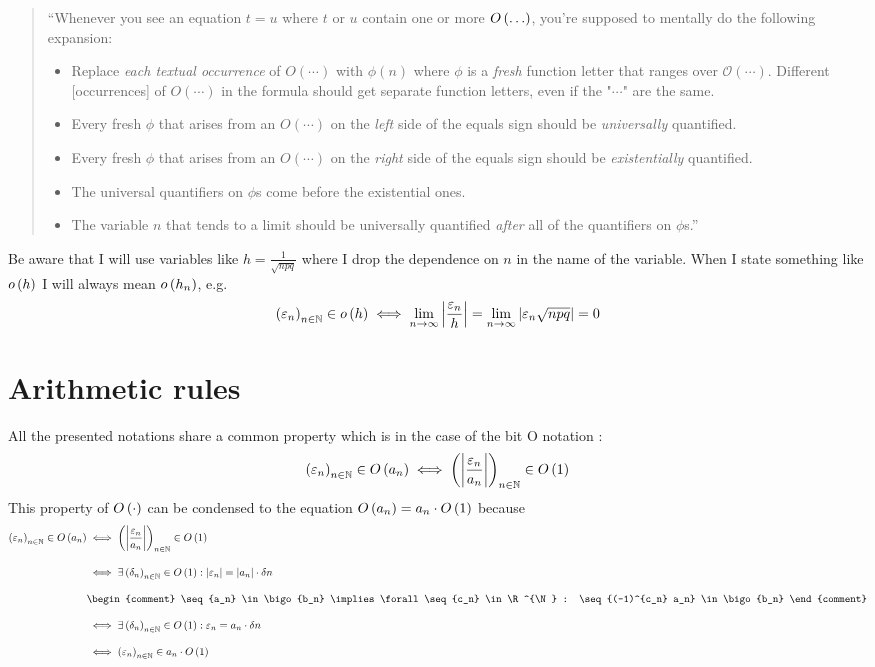 \begin{quote}
  ``Whenever you see an equation $t=u$ where $t$ or $u$ contain one or more $O\left( {\ldots} \right)$, you're supposed to mentally do the following expansion:
  \begin{itemize}
    \item Replace \emph{each textual occurrence} of $O(\cdots)$ with $\phi(n)$ where $\phi$ is a \emph{fresh} function letter that ranges over $\mathcal O(\cdots)$. Different [occurrences] of $O(\cdots)$ in the formula should get separate function letters, even if the "$\cdots$" are the same.
    \item Every fresh $\phi$ that arises from an $O(\cdots)$ on the \emph{left} side of the equals sign should be \emph{universally} quantified.
    \item Every fresh $\phi$ that arises from an $O(\cdots)$ on the \emph{right} side of the equals sign should be \emph{existentially} quantified.
    \item The universal quantifiers on $\phi$s come before the existential ones.
    \item The variable $n$ that tends to a limit should be universally quantified \emph{after} all of the quantifiers on $\phi$s.''
  \end{itemize}
\end{quote}

\begin{remark}
  Be aware that I will use variables like $h=\frac{1}{\sqrt{npq}}$ where I drop the dependence on $n$ in the name of the variable. When I state something like $o\left( {h} \right)$ I will always mean $o\left( {h_n} \right)$, e.g.
  \begin{align}
    \left({\varepsilon_n}\right)_{{n}\in\mathbb N} \in o\left( {h} \right) \iff \lim_{n\to\infty} \left|{\frac{\varepsilon_n}{h}}\right| = \lim_{n\to\infty} \left|{\varepsilon_n \sqrt{npq}}\right| = 0
  \end{align}
\end{remark}

\section{Arithmetic rules}

All the presented notations share a common property which is in the case of the bit O notation \cite{tampis:general}:
\begin{align}
  \left({\varepsilon_n}\right)_{{n}\in\mathbb N} \in O\left( {a_n} \right) \iff \left({\left|{\frac{\varepsilon_n}{a_n}}\right|}\right)_{{n}\in\mathbb N} \in O\left( {1} \right)
\end{align}
This property of $O\left( {\cdot} \right)$ can be condensed to the equation $O\left( {a_n} \right) = a_n \cdot O\left( {1} \right)$ because
\begin{align}
  \seq{\epsilon_n} \in \bigo{a_n} & \iff \seq{\abs{\frac{\epsilon_n}{a_n}}} \in \bigo{1} \bnl
  & \iff \exists \seq{\delta_n} \in \bigo{1} : \abs{\epsilon_n} = \abs{a_n} \cdot \delta n \bnl
  &
  \begin{comment}
    \seq{a_n} \in \bigo{b_n} \implies \forall \seq{c_n} \in \R^{\N} : \seq{(-1)^{c_n} a_n} \in \bigo{b_n}
  \end{comment} \bnl
  & \iff \exists \seq{\delta_n} \in \bigo{1} : \epsilon_n = a_n \cdot \delta n \bnl
  & \iff \seq{\epsilon_n} \in a_n \cdot \bigo{1} \bnl
\end{align}

